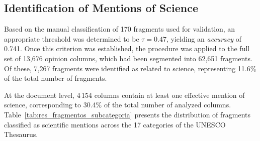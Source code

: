 \documentclass[11pt,a4paper]{article}
\begin{document}
	
\subsection{Identification of Mentions of Science}\label{sec:ident_menciones}


Based on the manual classification of 170 fragments used for validation, an appropriate threshold was determined to be $\tau = 0.47$, yielding an \emph{accuracy} of 0.741. Once this criterion was established, the procedure was applied to the full set of 13,676 opinion columns, which had been segmented into 62,651 fragments. Of these, 7,267 fragments were identified as related to science, representing 11.6\% of the total number of fragments.


At the document level, 4\,154 columns contain at least one effective mention of science, corresponding to 30.4\% of the total number of analyzed columns. Table~\ref{tab:res_fragmentos_subcategoria} presents the distribution of fragments classified as scientific mentions across the 17 categories of the UNESCO Thesaurus.

	
	
\end{document}

